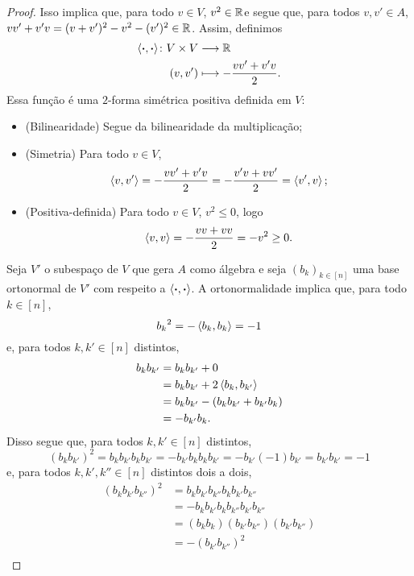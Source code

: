 \begin{proof}
Isso implica que, para todo $v \in V$, $v^2 \in \mathbb{R}$e segue que, para todos $v,v' \in A$, $vv'+v'v = (v+v')^2 - v^2 - (v')^2 \in \mathbb{R}$. Assim, definimos
	\begin{align*}
	{\left\langle{\bm{\cdot}},{\bm{\cdot}}\right\rangle}\colon {V \times V} &\longrightarrow {\mathbb{R}} \\{(v,v')} &\longmapsto -\frac{vv'+v'v}{2}.
	\end{align*}
Essa função é uma $2$-forma simétrica positiva definida em $V$:
	\begin{itemize}
		\item (Bilinearidade) Segue da bilinearidade da multiplicação;
		\item (Simetria) Para todo $v \in V$,
			\begin{equation*}
			\left\langle{v},{v'}\right\rangle = -\frac{vv'+v'v}{2} = -\frac{v'v+vv'}{2} = \left\langle{v'},{v}\right\rangle;
			\end{equation*}
		\item (Positiva-definida) Para todo $v \in V$, $v^2 \leq 0$, logo
			\begin{equation*}
			\left\langle{v},{v}\right\rangle = -\frac{vv+vv}{2} = -v^2 \geq 0.
			\end{equation*}
	\end{itemize}
Seja $V'$ o subespaço de $V$ que gera $A$ como álgebra e seja $(b_k)_{k \in [n]}$ uma base ortonormal de $V'$ com respeito a $\left\langle{\bm{\cdot}},{\bm{\cdot}}\right\rangle$. A ortonormalidade implica que, para todo $k \in [n]$,
	\begin{equation*}
	{b_k}^2 = -\left\langle{b_k},{b_k}\right\rangle = -1
	\end{equation*}
e, para todos $k,k' \in [n]$ distintos,
	\begin{align*}
	b_kb_{k'} &= b_kb_{k'} + 0 \\
		&= b_kb_{k'} + 2\left\langle{b_k},{b_{k'}}\right\rangle \\
		&= b_kb_{k'} -(b_kb_{k'}+b_{k'}b_k) \\
		&= -b_{k'}b_k.
	\end{align*}
Disso segue que, para todos $k,k' \in [n]$ distintos,
	\begin{equation*}
	(b_kb_{k'})^2 = b_kb_{k'}b_kb_{k'} = -b_{k'}b_kb_kb_{k'} = -b_{k'}(-1)b_{k'} = b_{k'}b_{k'} = -1
	\end{equation*}
e, para todos $k,k',k'' \in [n]$ distintos dois a dois,
	\begin{align*}
	(b_kb_{k'}b_{k''})^2 &= b_kb_{k'}b_{k''}b_kb_{k'}b_{k''} \\
		&= -b_kb_{k'}b_kb_{k''}b_{k'}b_{k''} \\
		&= (b_kb_k)(b_{k'}b_{k''})(b_{k'}b_{k''}) \\
		&= -(b_{k'}b_{k''})^2 \\

\end{align*}
\end{proof}

